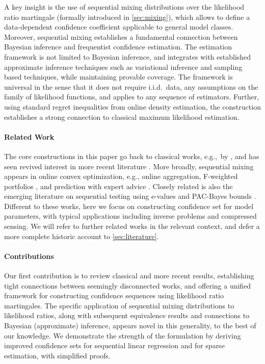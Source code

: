 A key insight is the use of sequential mixing distributions over the likelihood ratio martingale (formally introduced in \cref{sec:mixing}), which allows to define a data-dependent confidence coefficient applicable to general model classes. Moreover, sequential mixing establishes a fundamental connection between Bayesian inference and frequentist confidence estimation. The estimation framework is not limited to Bayesian inference, and integrates with established approximate inference techniques such as variational inference and sampling based techniques, while maintaining provable coverage. The framework is universal in the sense that it does not require i.i.d.~data, any assumptions on the family of likelihood functions, and applies to any sequence of estimators. Further, using standard regret inequalities from online density estimation, the construction establishes a strong connection to classical maximum likelihood estimation.

\paragraph{Related Work} The core constructions in this paper go back to classical works, e.g.,~by \cite{wald1945sequential,darling1968some,robbins1970statistical}, and has seen revived interest in more recent literature \citep[e.g.,][]{wasserman2020universal,Emm23,flynn2024improved,lee2024unified}. More broadly, sequential mixing appears in online convex optimization, e.g., online aggregation, F-weighted portfolios \citep[c.f.,][]{orabona2019modern}, and prediction with expert advice \citep{cesa2006prediction}. Closely related is also the emerging literature on sequential testing using e-values \citep[see, e.g.,][]{grunwald2020safe} and PAC-Bayes bounds \citep[e.g.,][]{lugosi2023online,chugg2023unified}. Different to these works, here we focus on constructing confidence set for model parameters, with typical applications including inverse problems and compressed sensing.  We will refer to further related works in the relevant context, and defer a more complete historic account to \cref{sec:literature}.

\paragraph{Contributions} Our first contribution is to review classical and more recent results, establishing tight connections between seemingly disconnected works, and offering a unified framework for constructing confidence sequences using likelihood ratio martingales. The specific application of sequential mixing distributions to likelihood ratios, along with subsequent equivalence results and connections to Bayesian (approximate) inference, appears novel in this generality, to the best of our knowledge. We demonstrate the strength of the formulation by deriving improved confidence sets for sequential linear regression and for sparse estimation, with simplified proofs.


